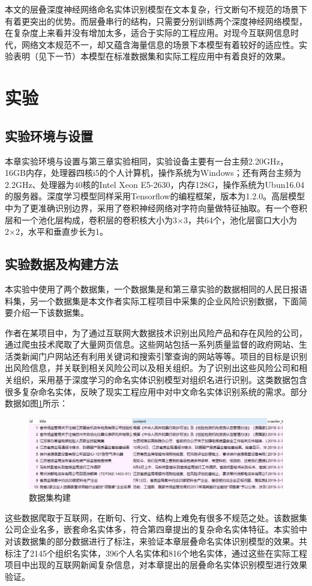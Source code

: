 \documentclass[winfonts,master,oneside,nobackinfo]{njuthesis}
\begin{document}
本文的层叠深度神经网络命名实体识别模型在文本复杂，行文断句不规范的场景下有着更突出的优势。而层叠串行的结构，只需要分别训练两个深度神经网络模型，在复杂度上来看并没有增加太多，适合于实际的工程应用。对现今互联网信息时代，网络文本规范不一，却又蕴含海量信息的场景下本模型有着较好的适应性。实验表明（见下一节）本模型在标准数据集和实际工程应用中有着良好的效果。

\section{实验}

\subsection{实验环境与设置}

本章实验环境与设置与第三章实验相同，实验设备主要有一台主频2.20GHz，16GB内存，处理器四核i5的个人计算机，操作系统为Windows；还有两台主频为2.2GHz、处理器为40核的Intel Xeon E5-2630，内存128G，操作系统为Ubun16.04的服务器。深度学习模型同样采用Tensorflow的编程框架，版本为1.2.0。高层模型中为了更准确识别边界，采用了卷积神经网络对字符向量做特征抽取。有一个卷积层和一个池化层构成，卷积层的卷积核大小为3×3，共64个，池化层窗口大小为2×2，水平和垂直步长为1。

\subsection{实验数据及构建方法}

本实验中使用了两个数据集，一个数据集是和第三章实验的数据相同的人民日报语料集，另一个数据集是本文作者实际工程项目中采集的企业风险识别数据，下面简要介绍一下该数据集。

作者在某项目中，为了通过互联网大数据技术识别出风险产品和存在风险的公司，通过爬虫技术爬取了大量网页信息。这些网站包括一系列质量监督的政府网站、生活类新闻门户网站还有利用关键词和搜索引擎查询的网站等等。项目的目标是识别出风险信息，并关联到相关风险公司以及相关组织。为了识别出这些风险公司和相关组织，采用基于深度学习的命名实体识别模型对组织名进行识别。这类数据包含很多复杂命名实体，反映了现实工程应用中对中文命名实体识别系统的需求。部分数据如图\ref{train-data}所示：

\begin{figure}[h]
\centering
\includegraphics[width=1\textwidth]{./figure/数据集.jpg}
\caption{数据集构建}
\label{train-data}
\end{figure}
这些数据爬取于互联网，在断句、行文、结构上难免有很多不规范之处。该数据集公司企业名多，嵌套命名实体多，符合第四章提出的复杂命名实体特征。本实验中对该数据集的部分数据进行了标注，来验证本章层叠命名实体识别模型的效果。共标注了2145个组织名实体，396个人名实体和816个地名实体，通过这些在实际工程项目中出现的互联网新闻复杂信息，对本章提出的层叠命名实体识别模型进行效果验证。
\end{document}
